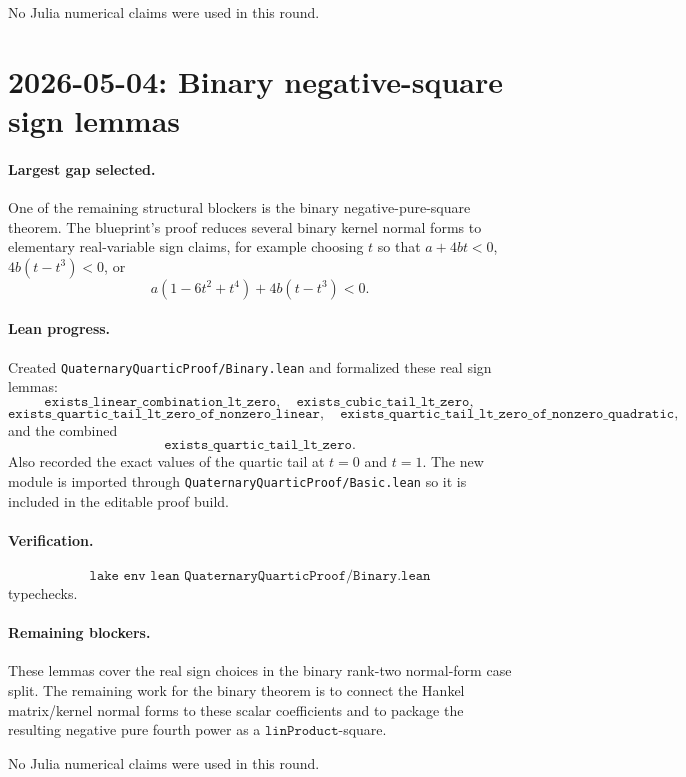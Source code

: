 \documentclass[11pt]{article}
\begin{document}
No Julia numerical claims were used in this round.

\section*{2026-05-04: Binary negative-square sign lemmas}

\paragraph{Largest gap selected.}
One of the remaining structural blockers is the binary negative-pure-square
theorem.  The blueprint's proof reduces several binary kernel normal forms to
elementary real-variable sign claims, for example choosing \(t\) so that
\(a+4bt<0\), \(4b(t-t^3)<0\), or
\[
a(1-6t^2+t^4)+4b(t-t^3)<0.
\]

\paragraph{Lean progress.}
Created \texttt{QuaternaryQuarticProof/Binary.lean} and formalized these
real sign lemmas:
\[
\texttt{exists\_linear\_combination\_lt\_zero},\quad
\texttt{exists\_cubic\_tail\_lt\_zero},
\]
\[
\texttt{exists\_quartic\_tail\_lt\_zero\_of\_nonzero\_linear},\quad
\texttt{exists\_quartic\_tail\_lt\_zero\_of\_nonzero\_quadratic},
\]
and the combined
\[
\texttt{exists\_quartic\_tail\_lt\_zero}.
\]
Also recorded the exact values of the quartic tail at \(t=0\) and \(t=1\).
The new module is imported through \texttt{QuaternaryQuarticProof/Basic.lean}
so it is included in the editable proof build.

\paragraph{Verification.}
\[
\texttt{lake env lean QuaternaryQuarticProof/Binary.lean}
\]
typechecks.

\paragraph{Remaining blockers.}
These lemmas cover the real sign choices in the binary rank-two normal-form
case split.  The remaining work for the binary theorem is to connect the
Hankel matrix/kernel normal forms to these scalar coefficients and to package
the resulting negative pure fourth power as a \(\texttt{linProduct}\)-square.

No Julia numerical claims were used in this round.
\end{document}
